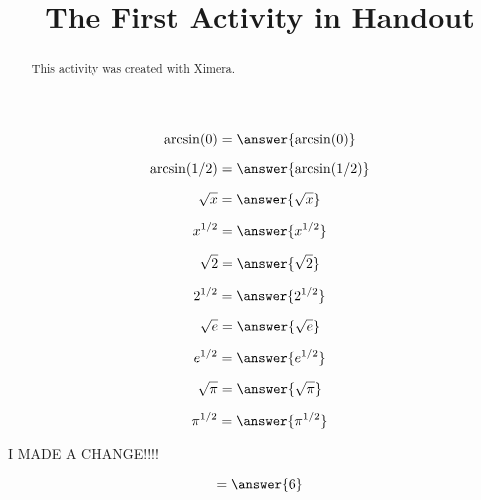\documentclass[handout]{ximera}
\title{The First Activity in Handout}
\begin{document}
  
\begin{abstract}  
This activity was created with Ximera.
\end{abstract}  
\maketitle

\begin{example}

  \[
  \arcsin(0) = \answer{\arcsin(0)}
  \]

  
  \[
  \arcsin(1/2) = \answer{\arcsin(1/2)}
  \]



  
\[
\sqrt{x} = \answer{\sqrt{x}}
\]

\[
x^{1/2} = \answer{x^{1/2}}
\]

\[
\sqrt{2} = \answer{\sqrt{2}}
\]

\[
2^{1/2} = \answer{2^{1/2}}
\] 

\[
\sqrt{e} = \answer{\sqrt{e}}
\]


\[
e^{1/2} = \answer{e^{1/2}}
\] 




\[
\sqrt{\pi} = \answer{\sqrt{\pi}}
\]


\[
\pi^{1/2} = \answer{\pi^{1/2}}
\] 
\end{example}
I MADE A CHANGE!!!!


\begin{problem}  
  \begin{prompt}
    \[
    = \answer{6}
    \]
  \end{prompt}
\end{problem}
\end{document}
